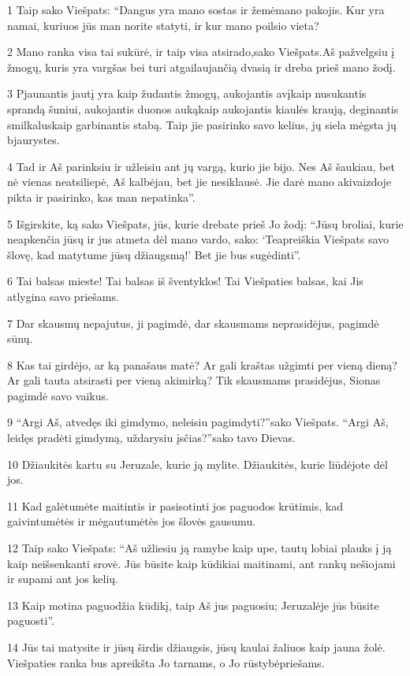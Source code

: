 \par 1 Taip sako Viešpats: “Dangus yra mano sostas ir žemė­mano pakojis. Kur yra namai, kuriuos jūs man norite statyti, ir kur mano poilsio vieta? 
\par 2 Mano ranka visa tai sukūrė, ir taip visa atsirado,­sako Viešpats.­Aš pažvelgsiu į žmogų, kuris yra vargšas bei turi atgailaujančią dvasią ir dreba prieš mano žodį. 
\par 3 Pjaunantis jautį yra kaip žudantis žmogų, aukojantis avį­kaip nusukantis sprandą šuniui, aukojantis duonos auką­kaip aukojantis kiaulės kraują, deginantis smilkalus­kaip garbinantis stabą. Taip jie pasirinko savo kelius, jų siela mėgsta jų bjaurystes. 
\par 4 Tad ir Aš parinksiu ir užleisiu ant jų vargą, kurio jie bijo. Nes Aš šaukiau, bet nė vienas neatsiliepė, Aš kalbėjau, bet jie nesiklausė. Jie darė mano akivaizdoje pikta ir pasirinko, kas man nepatinka”. 
\par 5 Išgirskite, ką sako Viešpats, jūs, kurie drebate prieš Jo žodį: “Jūsų broliai, kurie neapkenčia jūsų ir jus atmeta dėl mano vardo, sako: ‘Teapreiškia Viešpats savo šlovę, kad matytume jūsų džiaugsmą!’ Bet jie bus sugėdinti”. 
\par 6 Tai balsas mieste! Tai balsas iš šventyklos! Tai Viešpaties balsas, kai Jis atlygina savo priešams. 
\par 7 Dar skausmų nepajutus, ji pagimdė, dar skausmams neprasidėjus, pagimdė sūnų. 
\par 8 Kas tai girdėjo, ar ką panašaus matė? Ar gali kraštas užgimti per vieną dieną? Ar gali tauta atsirasti per vieną akimirką? Tik skausmams prasidėjus, Sionas pagimdė savo vaikus. 
\par 9 “Argi Aš, atvedęs iki gimdymo, neleisiu pagimdyti?”­sako Viešpats. “Argi Aš, leidęs pradėti gimdymą, uždarysiu įsčias?”­sako tavo Dievas. 
\par 10 Džiaukitės kartu su Jeruzale, kurie ją mylite. Džiaukitės, kurie liūdėjote dėl jos. 
\par 11 Kad galėtumėte maitintis ir pasisotinti jos paguodos krūtimis, kad gaivintumėtės ir mėgautumėtės jos šlovės gausumu. 
\par 12 Taip sako Viešpats: “Aš užliesiu ją ramybe kaip upe, tautų lobiai plauks į ją kaip neišsenkanti srovė. Jūs būsite kaip kūdikiai maitinami, ant rankų nešiojami ir supami ant jos kelių. 
\par 13 Kaip motina paguodžia kūdikį, taip Aš jus paguosiu; Jeruzalėje jūs būsite paguosti”. 
\par 14 Jūs tai matysite ir jūsų širdis džiaugsis, jūsų kaulai žaliuos kaip jauna žolė. Viešpaties ranka bus apreikšta Jo tarnams, o Jo rūstybė­priešams. 
